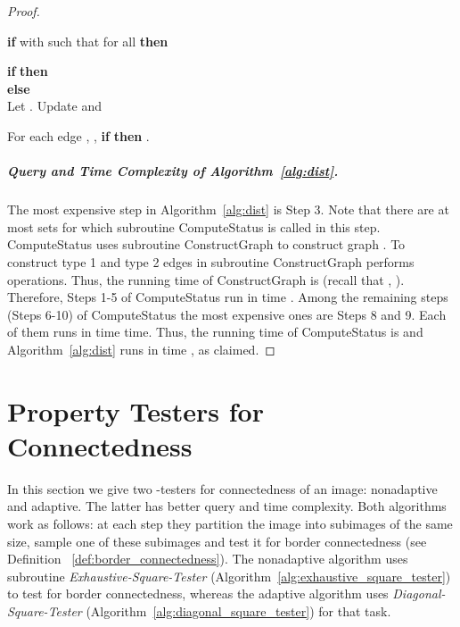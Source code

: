 \documentclass[11pt,english]{article}
\numberwithin{figure}{section}
\newcommand{\Compst}{{\sf ComputeStatus}\xspace}
\newcommand{\Constgr}{{\sf ConstructGraph}\xspace}
\begin{document}
\begin{proof}
\begin{algorithm}
\nl \textbf{if}  with  such that  for all  \textbf{then} \Return 

\nl \textbf{if}  \textbf{then} \\
\nl \textbf{else}\\ \nl\quad Let . Update  and 

\nl\quad For each edge , , \textbf{if}  \textbf{then} .

\nl{}

\nl{}

\nl \Return 

\end{algorithm}


\subparagraph{Query and Time Complexity of Algorithm~\ref{alg:dist}.}
The most expensive step in Algorithm~\ref{alg:dist} is Step 3. Note that there are at most  sets  for which subroutine \Compst is called in this step. \Compst uses subroutine \Constgr to construct graph . To construct type 1 and type 2 edges in  subroutine \Constgr performs  operations. Thus, the running time of \Constgr is  (recall that , ). Therefore, Steps 1-5 of \Compst run in time . Among the remaining steps (Steps 6-10) of \Compst the most expensive ones are Steps 8 and 9. Each of them runs in time  time. Thus, the running time of \Compst is  and Algorithm~\ref{alg:dist} runs in time , as claimed.
\end{proof}



\iffalse
\section{Property Testers for Connectedness}\label{tester_for_connectedness}
In this section we give two -testers
for connectedness of an image: nonadaptive and adaptive. The latter has better
query and time complexity. Both algorithms work as follows: at each step they
partition the image into subimages of the same size, sample one of these
subimages and test it for  border connectedness (see Definition~
\ref{def:border_connectedness}). The nonadaptive algorithm uses subroutine \emph{Exhaustive-Square-Tester}
(Algorithm~\ref{alg:exhaustive_square_tester}) to test for border connectedness, whereas the adaptive algorithm uses \emph{Diagonal-Square-Tester} (Algorithm~\ref{alg:diagonal_square_tester}) for that task.
\end{document}
